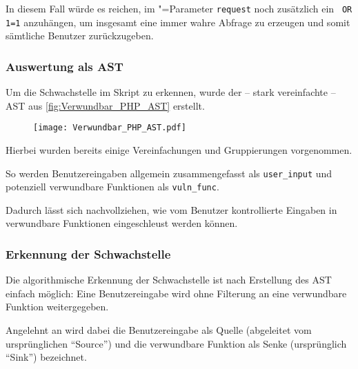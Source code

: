             In diesem Fall würde es reichen,
            im
            "=Parameter
            \lstinline{request} noch zusätzlich ein
            \lstinline| OR 1=1| anzuhängen,
            um insgesamt eine immer wahre Abfrage zu erzeugen und
            somit sämtliche Benutzer zurückzugeben.

            \subsubsection{Auswertung als AST}
                Um die Schwachstelle im Skript zu erkennen,
                wurde der
                -- stark vereinfachte
                --
                \gls{AST} aus
                \vref{fig:Verwundbar_PHP_AST} erstellt.

                \begin{figure}[htp]
                    \centering%
                    \texttt{[image: Verwundbar\_PHP\_AST.pdf]}
                    \label{fig:Verwundbar_PHP_AST}
                \end{figure}

                Hierbei wurden bereits einige Vereinfachungen und
                Gruppierungen vorgenommen.

                So werden Benutzereingaben allgemein zusammengefasst als
                \lstinline{user_input} und
                potenziell verwundbare Funktionen als
                \lstinline{vuln_func}.

                Dadurch lässt sich nachvollziehen,
                wie vom Benutzer kontrollierte Eingaben in verwundbare Funktionen eingeschleust werden können.

            \subsubsection{Erkennung der Schwachstelle}\label{PHP_Erkennung der Schwachstelle}
                Die algorithmische Erkennung der Schwachstelle ist nach Erstellung des
                \gls{AST} einfach möglich:
                Eine Benutzereingabe wird ohne Filterung an eine verwundbare Funktion weitergegeben.

                Angelehnt an
                \cite[4]{Schwartz2010} wird dabei die Benutzereingabe als Quelle
                (abgeleitet vom ursprünglichen
                \foreignquote{english}{Source}) und
                die verwundbare Funktion als Senke
                (ursprünglich
                \foreignquote{english}{Sink}) bezeichnet.

